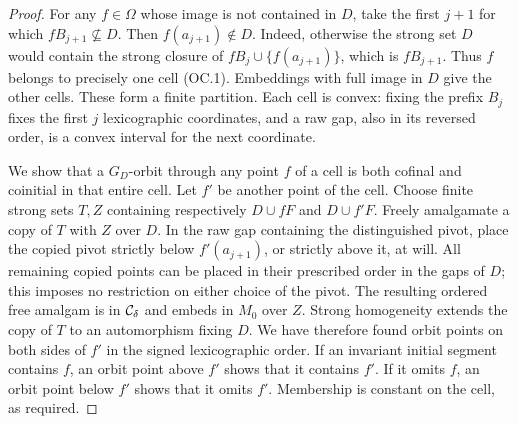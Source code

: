 \begin{proof}
For any $f\in\Omega$ whose image is not contained in $D$, take
the first $j+1$ for which $fB_{j+1}\not\subseteq D$.
Then $f(a_{j+1})\notin D$. Indeed, otherwise the strong set $D$
would contain the strong closure of $fB_j\cup\{f(a_{j+1})\}$,
which is $fB_{j+1}$. Thus $f$ belongs to precisely one cell
(OC.1). Embeddings with full image in $D$ give the other cells.
These form a finite partition. Each cell is convex: fixing the
prefix $B_j$ fixes the first $j$ lexicographic coordinates,
and a raw gap, also in its reversed order, is a convex interval
for the next coordinate.

We show that a $G_D$-orbit through any point $f$ of a cell is
both cofinal and coinitial in that entire cell. Let $f'$ be
another point of the cell. Choose finite strong sets $T,Z$
containing respectively $D\cup fF$ and $D\cup f'F$. Freely
amalgamate a copy of $T$ with $Z$ over $D$. In the raw gap
containing the distinguished pivot, place the copied pivot
strictly below $f'(a_{j+1})$, or strictly above it, at will.
All remaining copied points can be placed in their prescribed
order in the gaps of $D$; this imposes no restriction on either
choice of the pivot. The resulting ordered free amalgam is in
$\mathcal C_\delta$ and embeds in $M_0$ over $Z$. Strong homogeneity
extends the copy of $T$ to an automorphism fixing $D$. We have
therefore found orbit points on both sides of $f'$ in the
signed lexicographic order. If an invariant initial segment
contains $f$, an orbit point above $f'$ shows that it contains
$f'$. If it omits $f$, an orbit point below $f'$ shows that it
omits $f'$. Membership is constant on the cell, as required.
\end{proof}

